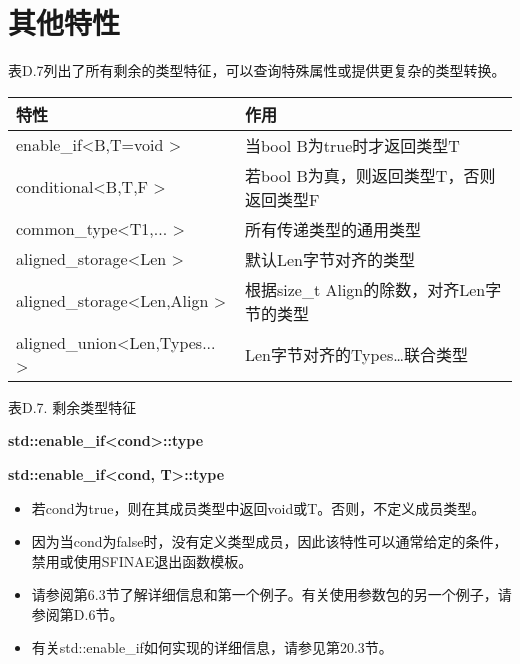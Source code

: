 \section{其他特性}


表D.7列出了所有剩余的类型特征，可以查询特殊属性或提供更复杂的类型转换。

\begin{table}[H]
	\begin{center}
	\begin{tabular}{l|l}
		\hline
		\textbf{特性}                                       & \textbf{作用}                                                   \\ \hline
		enable\_if\textless{}B,T=void \textgreater{}         & 当bool B为true时才返回类型T                              \\ \hline
		conditional\textless{}B,T,F \textgreater{}           & 若bool B为真，则返回类型T，否则返回类型F              \\ \hline
		common\_type\textless{}T1,... \textgreater{}         & 所有传递类型的通用类型                                   \\ \hline
		aligned\_storage\textless{}Len \textgreater{}        & 默认Len字节对齐的类型                          \\ \hline
		aligned\_storage\textless{}Len,Align \textgreater{}  & 根据size\_t Align的除数，对齐Len字节的类型 \\ \hline
		aligned\_union\textless{}Len,Types... \textgreater{} & Len字节对齐的Types…联合类型                 \\ \hline
	\end{tabular}
	\end{center}
\end{table}

\begin{center}
表D.7. 剩余类型特征
\end{center}

\textbf{std::enable\_if<cond>::type}

\textbf{std::enable\_if<cond, T>::type}

\begin{itemize}
\item
若cond为true，则在其成员类型中返回void或T。否则，不定义成员类型。

\item
因为当cond为false时，没有定义类型成员，因此该特性可以通常给定的条件，禁用或使用SFINAE退出函数模板。

\item
请参阅第6.3节了解详细信息和第一个例子。有关使用参数包的另一个例子，请参阅第D.6节。

\item
有关std::enable\_if如何实现的详细信息，请参见第20.3节。
\end{itemize}

